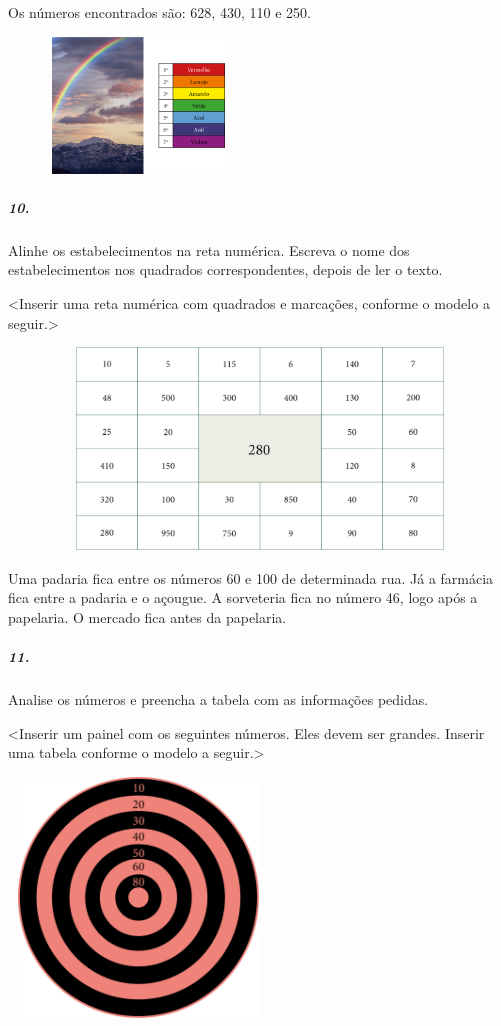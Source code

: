 Os números encontrados são: 628, 430, 110 e 250.

\includegraphics[width=2.71875in,height=1.42734in]{media/image21.png}

\subparagraph{10. }\label{section-9}

Alinhe os estabelecimentos na reta numérica. Escreva o nome dos
estabelecimentos nos quadrados correspondentes, depois de ler o texto.

\textless{}Inserir uma reta numérica com quadrados e marcações, conforme
o modelo a seguir.\textgreater{}

\includegraphics[width=6.36364in,height=2.11458in]{media/image22.png}

Uma padaria fica entre os números 60 e 100 de determinada rua. Já a
farmácia fica entre a padaria e o açougue. A sorveteria fica no número
46, logo após a papelaria. O mercado fica antes da papelaria.

\subparagraph{11. }\label{section-10}

Analise os números e preencha a tabela com as informações pedidas.

\textless{}Inserir um painel com os seguintes números. Eles devem ser
grandes. Inserir uma tabela conforme o modelo a seguir.\textgreater{}

\includegraphics[width=2.72103in,height=2.51437in]{media/image23.png}

